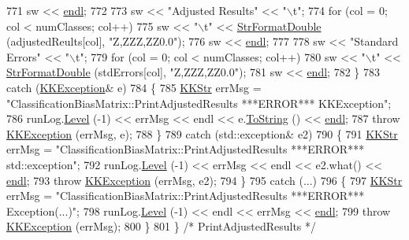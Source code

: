 \begin{DoxyCode}
771     sw << \hyperlink{namespace_k_k_b_ad1f50f65af6adc8fa9e6f62d007818a8}{endl};
772 
773     sw << \textcolor{stringliteral}{"Adjusted Results"} << \textcolor{stringliteral}{"\(\backslash\)t"};
774     \textcolor{keywordflow}{for}  (col = 0;  col < numClasses;  col++)
775       sw << \textcolor{stringliteral}{"\(\backslash\)t"} << \hyperlink{namespace_k_k_b_a1a40a40e955fa5417a7cdd990e0021b1}{StrFormatDouble} (adjustedReults[col], \textcolor{stringliteral}{"Z,ZZZ,ZZ0.0"});
776     sw << \hyperlink{namespace_k_k_b_ad1f50f65af6adc8fa9e6f62d007818a8}{endl};
777 
778     sw << \textcolor{stringliteral}{"Standard Errors"} << \textcolor{stringliteral}{"\(\backslash\)t"};
779     \textcolor{keywordflow}{for}  (col = 0;  col < numClasses;  col++)
780       sw << \textcolor{stringliteral}{"\(\backslash\)t"} << \hyperlink{namespace_k_k_b_a1a40a40e955fa5417a7cdd990e0021b1}{StrFormatDouble} (stdErrors[col], \textcolor{stringliteral}{"Z,ZZZ,ZZ0.0"});
781     sw << \hyperlink{namespace_k_k_b_ad1f50f65af6adc8fa9e6f62d007818a8}{endl};
782   \}
783   \textcolor{keywordflow}{catch}  (\hyperlink{class_k_k_b_1_1_k_k_exception}{KKException}&  e)
784   \{
785     \hyperlink{class_k_k_b_1_1_k_k_str}{KKStr}  errMsg = \textcolor{stringliteral}{"ClassificationBiasMatrix::PrintAdjustedResults   ***ERROR***  KKException"};
786     runLog.\hyperlink{class_k_k_b_1_1_run_log_a32cf761d7f2e747465fd80533fdbb659}{Level} (-1) << errMsg << endl << e.\hyperlink{class_k_k_b_1_1_k_k_exception_a9d565e887e90968c5e306c1ea94c6894}{ToString} () << \hyperlink{namespace_k_k_b_ad1f50f65af6adc8fa9e6f62d007818a8}{endl};
787     \textcolor{keywordflow}{throw} \hyperlink{class_k_k_b_1_1_k_k_exception}{KKException} (errMsg, e);
788   \}
789   \textcolor{keywordflow}{catch}  (std::exception& e2)
790   \{
791     \hyperlink{class_k_k_b_1_1_k_k_str}{KKStr}  errMsg = \textcolor{stringliteral}{"ClassificationBiasMatrix::PrintAdjustedResults   ***ERROR***  std::exception"};
792     runLog.\hyperlink{class_k_k_b_1_1_run_log_a32cf761d7f2e747465fd80533fdbb659}{Level} (-1) << errMsg << endl << e2.what() << \hyperlink{namespace_k_k_b_ad1f50f65af6adc8fa9e6f62d007818a8}{endl};
793     \textcolor{keywordflow}{throw} \hyperlink{class_k_k_b_1_1_k_k_exception}{KKException} (errMsg, e2);
794   \}
795   \textcolor{keywordflow}{catch}  (...)
796   \{
797     \hyperlink{class_k_k_b_1_1_k_k_str}{KKStr}  errMsg = \textcolor{stringliteral}{"ClassificationBiasMatrix::PrintAdjustedResults   ***ERROR***  Exception(...)"};
798     runLog.\hyperlink{class_k_k_b_1_1_run_log_a32cf761d7f2e747465fd80533fdbb659}{Level} (-1) << endl << errMsg << \hyperlink{namespace_k_k_b_ad1f50f65af6adc8fa9e6f62d007818a8}{endl};
799     \textcolor{keywordflow}{throw} \hyperlink{class_k_k_b_1_1_k_k_exception}{KKException} (errMsg);
800   \}
801 \}  \textcolor{comment}{/* PrintAdjustedResults */}
\end{DoxyCode}
